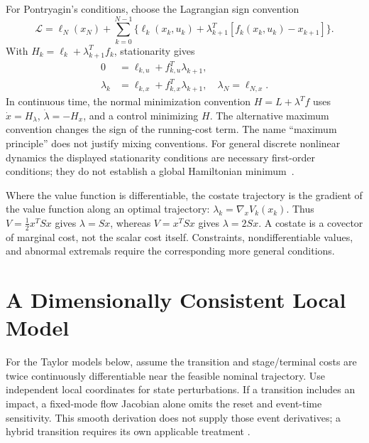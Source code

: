 For Pontryagin's conditions, choose the Lagrangian sign convention
\begin{equation}
\mathcal L=\ell_N(x_N)+\sum_{k=0}^{N-1}
\{\ell_k(x_k,u_k)+\lambda_{k+1}^{T}[f_k(x_k,u_k)-x_{k+1}]\}.
\label{eq:ch5:lagrangian}
\end{equation}
With $H_k=\ell_k+\lambda_{k+1}^{T}f_k$, stationarity gives
\begin{align}
0&=\ell_{k,u}+f_{k,u}^{T}\lambda_{k+1},\label{eq:ch5:kkt-u}\\
\lambda_k&=\ell_{k,x}+f_{k,x}^{T}\lambda_{k+1},\quad
\lambda_N=\ell_{N,x}.\label{eq:ch5:costate-update}
\end{align}
In continuous time, the normal minimization convention $H=L+\lambda^Tf$
uses $\dot x=H_\lambda$, $\dot\lambda=-H_x$, and a control minimizing $H$.
The alternative maximum convention changes the sign of the running-cost term.
The name ``maximum principle'' does not justify mixing conventions. For
general discrete nonlinear dynamics the displayed stationarity conditions are
necessary first-order conditions; they do not establish a global Hamiltonian
minimum~\cite{pontryagin1962}.

Where the value function is differentiable, the costate trajectory is the
gradient of the value function along an optimal trajectory:
$\lambda_k=\nabla_xV_k(x_k)$. Thus $V=\tfrac12x^TSx$ gives $\lambda=Sx$,
whereas $V=x^TSx$ gives $\lambda=2Sx$. A costate is a covector of marginal
cost, not the scalar cost itself. Constraints, nondifferentiable values, and
abnormal extremals require the corresponding more general conditions.

\section{A Dimensionally Consistent Local Model}

For the Taylor models below, assume the transition and stage/terminal costs
are twice continuously differentiable near the feasible nominal trajectory.
Use independent local coordinates for state perturbations. If a transition
includes an impact, a fixed-mode flow Jacobian alone omits the reset and
event-time sensitivity. This smooth derivation does not supply those event
derivatives; a hybrid transition requires its own applicable treatment
\cite{Kong2024SaltationFoundations}.

